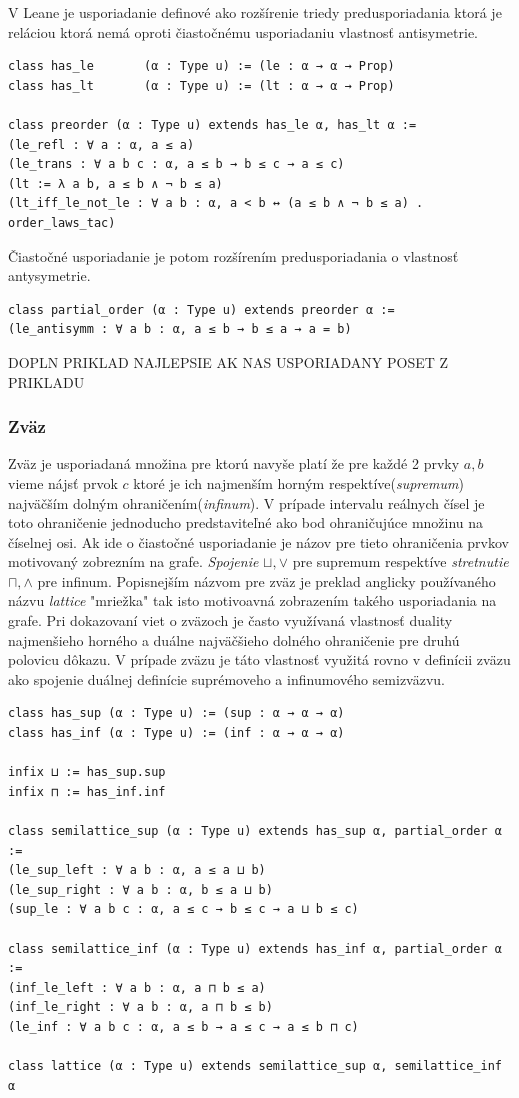 \documentclass[a4paper,10pt,oneside]{report}%
\begin{document}
    V Leane je usporiadanie definové ako rozšírenie triedy predusporiadania ktorá
je reláciou ktorá nemá oproti čiastočnému usporiadaniu vlastnosť antisymetrie.

\begin{lstlisting}
class has_le       (α : Type u) := (le : α → α → Prop)
class has_lt       (α : Type u) := (lt : α → α → Prop)

class preorder (α : Type u) extends has_le α, has_lt α :=
(le_refl : ∀ a : α, a ≤ a)
(le_trans : ∀ a b c : α, a ≤ b → b ≤ c → a ≤ c)
(lt := λ a b, a ≤ b ∧ ¬ b ≤ a)
(lt_iff_le_not_le : ∀ a b : α, a < b ↔ (a ≤ b ∧ ¬ b ≤ a) . order_laws_tac)
\end{lstlisting}
Čiastočné usporiadanie je potom rozšírením predusporiadania o vlastnosť antysymetrie.
\begin{lstlisting}
class partial_order (α : Type u) extends preorder α :=
(le_antisymm : ∀ a b : α, a ≤ b → b ≤ a → a = b)
\end{lstlisting}

DOPLN PRIKLAD NAJLEPSIE AK NAS USPORIADANY POSET Z PRIKLADU

\subsubsection{Zväz}
    Zväz je usporiadaná množina pre ktorú navyše platí že pre každé 2 prvky $a, b$
vieme nájsť prvok $c$ ktoré je ich najmenším horným respektíve(\emph{supremum})
najväčším dolným ohraničením(\emph{infinum}).
    V prípade intervalu reálnych čísel je toto ohraničenie jednoducho predstaviteľné
ako bod ohraničujúce množinu na číselnej osi.
    Ak ide o čiastočné usporiadanie je názov pre tieto ohraničenia prvkov
motivovaný zobrezním na grafe.
    \emph{Spojenie} $\sqcup, \vee$ pre supremum respektíve \emph{stretnutie} $\sqcap, \wedge$ pre infinum.
    Popisnejším názvom pre zväz je preklad anglicky používaného názvu \emph{lattice}
"mriežka" tak isto motivoavná zobrazením takého usporiadania na grafe.
    Pri dokazovaní viet o zväzoch je často využívaná vlastnosť duality najmenšieho
horného a duálne najväčšieho dolného ohraničenie pre druhú polovicu dôkazu.
    V prípade zväzu je táto vlastnosť využitá rovno v definícii zväzu ako spojenie
duálnej definície suprémoveho a infinumového semizväzvu.

\begin{lstlisting}
class has_sup (α : Type u) := (sup : α → α → α)
class has_inf (α : Type u) := (inf : α → α → α)

infix ⊔ := has_sup.sup
infix ⊓ := has_inf.inf

class semilattice_sup (α : Type u) extends has_sup α, partial_order α :=
(le_sup_left : ∀ a b : α, a ≤ a ⊔ b)
(le_sup_right : ∀ a b : α, b ≤ a ⊔ b)
(sup_le : ∀ a b c : α, a ≤ c → b ≤ c → a ⊔ b ≤ c)

class semilattice_inf (α : Type u) extends has_inf α, partial_order α :=
(inf_le_left : ∀ a b : α, a ⊓ b ≤ a)
(inf_le_right : ∀ a b : α, a ⊓ b ≤ b)
(le_inf : ∀ a b c : α, a ≤ b → a ≤ c → a ≤ b ⊓ c)

class lattice (α : Type u) extends semilattice_sup α, semilattice_inf α
\end{lstlisting}
\end{document}
